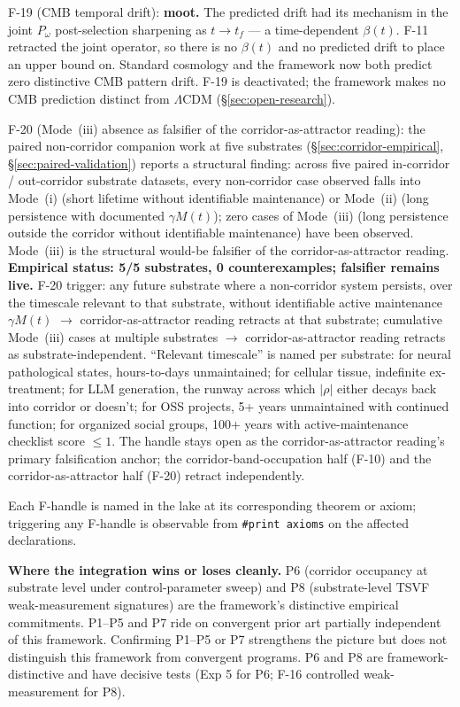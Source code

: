 \documentclass[11pt,a4paper]{article}
\newcommand{\Pomega}{P_{\omega}}
\begin{document}
F-19 (CMB temporal drift): \textbf{moot.} The predicted drift had its mechanism in the joint $\Pomega$ post-selection sharpening as $t \to t_f$ --- a time-dependent $\beta(t)$. F-11 retracted the joint operator, so there is no $\beta(t)$ and no predicted drift to place an upper bound on. Standard cosmology and the framework now both predict zero distinctive CMB pattern drift. F-19 is deactivated; the framework makes no CMB prediction distinct from $\Lambda$CDM (\S\ref{sec:open-research}).

F-20 (Mode~(iii) absence as falsifier of the corridor-as-attractor reading): the paired non-corridor companion work at five substrates (\S\ref{sec:corridor-empirical}, \S\ref{sec:paired-validation}) reports a structural finding: across five paired in-corridor / out-corridor substrate datasets, every non-corridor case observed falls into Mode~(i) (short lifetime without identifiable maintenance) or Mode~(ii) (long persistence with documented $\gamma M(t)$); zero cases of Mode~(iii) (long persistence outside the corridor without identifiable maintenance) have been observed. Mode~(iii) is the structural would-be falsifier of the corridor-as-attractor reading. \textbf{Empirical status: 5/5 substrates, 0 counterexamples; falsifier remains live.} F-20 trigger: any future substrate where a non-corridor system persists, over the timescale relevant to that substrate, without identifiable active maintenance $\gamma M(t)$ $\to$ corridor-as-attractor reading retracts at that substrate; cumulative Mode~(iii) cases at multiple substrates $\to$ corridor-as-attractor reading retracts as substrate-independent. ``Relevant timescale'' is named per substrate: for neural pathological states, hours-to-days unmaintained; for cellular tissue, indefinite ex-treatment; for LLM generation, the runway across which $|\rho|$ either decays back into corridor or doesn't; for OSS projects, 5+ years unmaintained with continued function; for organized social groups, 100+ years with active-maintenance checklist score $\le 1$. The handle stays open as the corridor-as-attractor reading's primary falsification anchor; the corridor-band-occupation half (F-10) and the corridor-as-attractor half (F-20) retract independently.


Each F-handle is named in the lake at its corresponding theorem or axiom; triggering any F-handle is observable from \texttt{\#print axioms} on the affected declarations.

\textbf{Where the integration wins or loses cleanly.} P6 (corridor occupancy at substrate level under control-parameter sweep) and P8 (substrate-level TSVF weak-measurement signatures) are the framework's distinctive empirical commitments. P1--P5 and P7 ride on convergent prior art partially independent of this framework. Confirming P1--P5 or P7 strengthens the picture but does not distinguish this framework from convergent programs. P6 and P8 are framework-distinctive and have decisive tests (Exp 5 for P6; F-16 controlled weak-measurement for P8).
\end{document}
